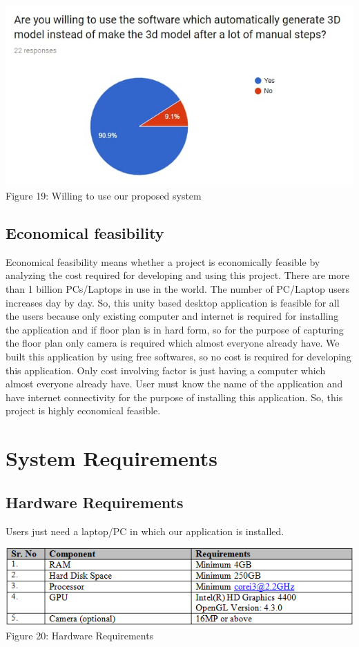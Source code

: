 \documentclass{article}
\begin{document}
\begin{center}
\includegraphics[scale=0.7]{lastgraph}
\\Figure 19: Willing to use our proposed system
\end{center}
 

\subsection{Economical feasibility}

Economical feasibility means whether a project is economically feasible by analyzing the cost required for developing and using this project. There are more than 1 billion PCs/Laptops in use in the world. The number of PC/Laptop users increases day by day. So, this unity based desktop application is feasible for all the users because only existing computer and internet is required for installing the application and if floor plan is in hard form, so for the purpose of capturing  the floor plan only camera is required which almost everyone already have. We built this application by using free softwares, so no cost is required for developing this application. Only cost involving factor is just having a computer which almost everyone already have. User must know the name of the application and have internet connectivity for the purpose of installing this application. So, this project is highly economical feasible.\cite{econFeas}\\

\section{System Requirements}
\subsection{Hardware Requirements}
Users just need a laptop/PC in which our application is installed.
\begin{center}
\includegraphics[scale=0.8]{table2}
\\Figure 20: Hardware Requirements
\end{center}
\end{document}
